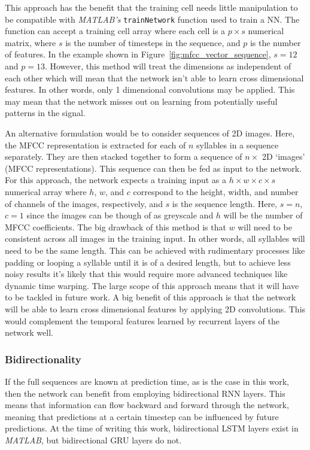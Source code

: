 This approach has the benefit that the training cell needs little
manipulation to be compatible with \textit{MATLAB's} \texttt{trainNetwork}
function used to train a NN\@. The function can accept a training cell array
where each cell is a $p \times s$ numerical matrix, where $s$ is the number
of timesteps in the sequence, and $p$ is the number of features. In the
example shown in Figure~\ref{fig:mfcc_vector_sequence}, $s=12$ and $p=13$.
However, this method will treat the dimensions as independent of each other
which will mean that the network isn't able to learn cross dimensional
features. In other words, only 1 dimensional convolutions may be applied.
This may mean that the network misses out on learning from potentially
useful patterns in the signal.

An alternative formulation would be to consider sequences of 2D images.
Here, the MFCC representation is extracted for each of $n$ syllables in a
sequence separately. They are then stacked together to form a sequence of $n
\times$ 2D `images' (MFCC representations). This sequence can then be fed as
input to the network. For this approach, the network expects a training input as
a $h \times w \times c \times s$ numerical array where $h$, $w$, and $c$
correspond to the height, width, and number of channels of the images,
respectively, and $s$ is the sequence length. Here, $s=n$, $c=1$ since the
images can be though of as greyscale and $h$ will be the number of MFCC
coefficients. The big drawback of this method is that $w$ will need to be
consistent across all images in the training input. In other words, all syllables
will need to be the same length. This can be achieved with rudimentary processes
like padding or looping a syllable until it is of a desired length, but to achieve
less noisy results it's likely that this would require more advanced techniques
like dynamic time warping. The large scope of this approach means that it will
have to be tackled in future work. A big benefit of this approach is that the
network will be able to learn cross dimensional features by applying 2D
convolutions. This would complement the temporal features learned by
recurrent layers of the network well.

\subsubsection{Bidirectionality}

If the full sequences are known at prediction time, as is the case in this work,
then the network can benefit from employing bidirectional RNN layers. This means
that information can flow backward and forward through the network, meaning that
predictions at a certain timestep can be influenced by future predictions. At
the time of writing this work, bidirectional LSTM layers exist in
\textit{MATLAB}, but bidirectional GRU layers do not.

